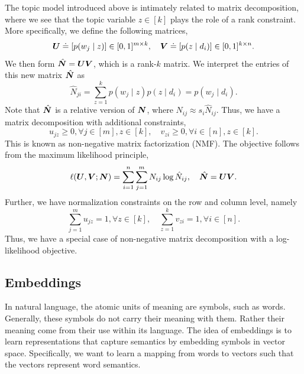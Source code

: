 The topic model introduced above is intimately related to matrix decomposition, where we see that
the topic variable $z \in [k]$ plays the role of a rank constraint. More specifically, we define
the following matrices, \[
    \bm{U} \doteq [p(w_j \mid z)] \in [0,1]^{m \times k}, \quad \bm{V} \doteq [p(z \mid d_i)] \in [0,1]^{k \times n}.
\]
We then form $\hat{\bm{N}} = \bm{U} \bm{V}$, which is a rank-$k$ matrix. We interpret the
entries of this new matrix $\hat{\bm{N}}$ as \[
    \hat{N}_{ji} = \sum_{z=1}^{k} p(w_j \mid z) p(z \mid d_i) = p(w_j \mid d_i).
\]
Note that $\hat{\bm{N}}$ is a relative version of $\bm{N}$, where $N_{ij} \approx s_i
    \hat{N}_{ij}$. Thus, we have a matrix decomposition with additional constraints, \[
    u_{jz} \geq 0, \forall j \in [m], z \in [k], \quad v_{zi} \geq 0, \forall i \in [n], z \in [k].
\]
This is known as non-negative matrix factorization (NMF). The objective follows from the maximum
likelihood principle, \[
    \ell(\bm{U}, \bm{V}; \bm{N}) = \sum_{i=1}^{n} \sum_{j=1}^{m} N_{ij} \log \hat{N}_{ij}, \quad \hat{\bm{N}} = \bm{U} \bm{V}.
\]
Further, we have normalization constraints on the row and column level, namely \[
    \sum_{j=1}^{m} u_{jz} = 1, \forall z \in [k], \quad \sum_{z=1}^{k} v_{zi} = 1, \forall i \in [n].
\]
Thus, we have a special case of non-negative matrix decomposition with a log-likelihood objective.

\subsection{Embeddings}

In natural language, the atomic units of meaning are symbols, such as words. Generally, these
symbols do not carry their meaning with them. Rather their meaning come from their use within its
language. The idea of embeddings is to learn representations that capture semantics by embedding
symbols in vector space. Specifically, we want to learn a mapping from words to vectors such that
the vectors represent word semantics.

